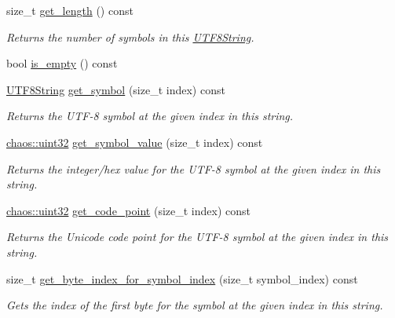 \begin{DoxyCompactItemize}
size\-\_\-t \hyperlink{classchaos_1_1str_1_1_u_t_f8_string_ac0c724e649182e02462b48b94d1f5bf7}{get\-\_\-length} () const 
\begin{DoxyCompactList}\small\item\em Returns the number of symbols in this \hyperlink{classchaos_1_1str_1_1_u_t_f8_string}{U\-T\-F8\-String}. \end{DoxyCompactList}\item 
bool \hyperlink{classchaos_1_1str_1_1_u_t_f8_string_a4fc296e90fbbc45a1e3f142dcd1e9853}{is\-\_\-empty} () const 
\item 
\hyperlink{classchaos_1_1str_1_1_u_t_f8_string}{U\-T\-F8\-String} \hyperlink{classchaos_1_1str_1_1_u_t_f8_string_a04dbe9f15dc1b09c858e2450de26d40a}{get\-\_\-symbol} (size\-\_\-t index) const 
\begin{DoxyCompactList}\small\item\em Returns the U\-T\-F-\/8 symbol at the given index in this string. \end{DoxyCompactList}\item 
\hyperlink{namespacechaos_a3b3a47ba1e284655bf1a30c441121c60}{chaos\-::uint32} \hyperlink{classchaos_1_1str_1_1_u_t_f8_string_a1248ee0dde0ff8e028d162cefd67f034}{get\-\_\-symbol\-\_\-value} (size\-\_\-t index) const 
\begin{DoxyCompactList}\small\item\em Returns the integer/hex value for the U\-T\-F-\/8 symbol at the given index in this string. \end{DoxyCompactList}\item 
\hyperlink{namespacechaos_a3b3a47ba1e284655bf1a30c441121c60}{chaos\-::uint32} \hyperlink{classchaos_1_1str_1_1_u_t_f8_string_a007889a60f57ec9196dcebb39abeafdf}{get\-\_\-code\-\_\-point} (size\-\_\-t index) const 
\begin{DoxyCompactList}\small\item\em Returns the Unicode code point for the U\-T\-F-\/8 symbol at the given index in this string. \end{DoxyCompactList}\item 
size\-\_\-t \hyperlink{classchaos_1_1str_1_1_u_t_f8_string_a4dddd9c6133754f5f424033ab28dc0e5}{get\-\_\-byte\-\_\-index\-\_\-for\-\_\-symbol\-\_\-index} (size\-\_\-t symbol\-\_\-index) const 
\begin{DoxyCompactList}\small\item\em Gets the index of the first byte for the symbol at the given index in this string. \end{DoxyCompactList}\item 

\end{DoxyCompactItemize}
